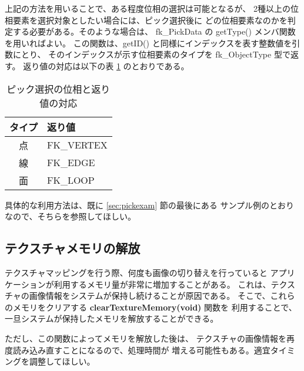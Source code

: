 上記の方法を用いることで、ある程度位相の選択は可能となるが、
2種以上の位相要素を選択対象としたい場合には、ピック選択後に
どの位相要素なのかを判定する必要がある。そのような場合は、
fk\_PickData の getType() メンバ関数を用いればよい。
この関数は、getID() と同様にインデックスを表す整数値を引数にとり、
そのインデックスが示す位相要素のタイプを fk\_ObjectType 型で返す。
返り値の対応は以下の表 \ref{tbl:picktype} のとおりである。

\begin{table}[H]
\caption{ピック選択の位相と返り値の対応}
\label{tbl:picktype}
\begin{center}
\begin{tabular}{|c|l|}
\hline
タイプ & 返り値 \\ \hline \hline
点 & FK\_VERTEX \\ \hline
線 & FK\_EDGE \\ \hline
面 & FK\_LOOP \\ \hline
\end{tabular}
\end{center}
\end{table}

具体的な利用方法は、既に \ref{sec:pickexam} 節の最後にある
サンプル例のとおりなので、そちらを参照してほしい。

\subsection{テクスチャメモリの解放}
テクスチャマッピングを行う際、何度も画像の切り替えを行っていると
アプリケーションが利用するメモリ量が非常に増加することがある。
これは、テクスチャの画像情報をシステムが保持し続けることが原因である。
そこで、これらのメモリをクリアする \textbf{clearTextureMemory(void)} 関数を
利用することで、一旦システムが保持したメモリを解放することができる。

ただし、この関数によってメモリを解放した後は、
テクスチャの画像情報を再度読み込み直すことになるので、処理時間が
増える可能性もある。適宜タイミングを調整してほしい。


